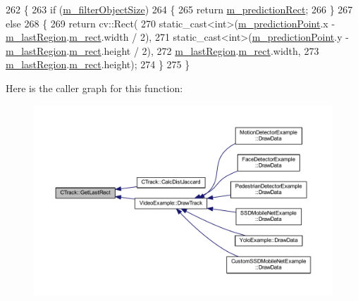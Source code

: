 \begin{DoxyCode}
262 \{
263     \textcolor{keywordflow}{if} (\mbox{\hyperlink{class_c_track_a5573dab5b9fe2e5143204355b8146c87}{m\_filterObjectSize}})
264     \{
265         \textcolor{keywordflow}{return} \mbox{\hyperlink{class_c_track_aeab9c3c95a6d988918f5874a8910b90b}{m\_predictionRect}};
266     \}
267     \textcolor{keywordflow}{else}
268     \{
269         \textcolor{keywordflow}{return} cv::Rect(
270                     static\_cast<int>(\mbox{\hyperlink{class_c_track_a8ee3f8baaf290aeb113f34c26a446a76}{m\_predictionPoint}}.x - 
      \mbox{\hyperlink{class_c_track_a5af91fbfad7ebf07bd0f681f915e440c}{m\_lastRegion}}.\mbox{\hyperlink{class_c_region_a6f68304e90428db829cc38792fa3e1e8}{m\_rect}}.width / 2),
271                     static\_cast<int>(\mbox{\hyperlink{class_c_track_a8ee3f8baaf290aeb113f34c26a446a76}{m\_predictionPoint}}.y - 
      \mbox{\hyperlink{class_c_track_a5af91fbfad7ebf07bd0f681f915e440c}{m\_lastRegion}}.\mbox{\hyperlink{class_c_region_a6f68304e90428db829cc38792fa3e1e8}{m\_rect}}.height / 2),
272                     \mbox{\hyperlink{class_c_track_a5af91fbfad7ebf07bd0f681f915e440c}{m\_lastRegion}}.\mbox{\hyperlink{class_c_region_a6f68304e90428db829cc38792fa3e1e8}{m\_rect}}.width,
273                     \mbox{\hyperlink{class_c_track_a5af91fbfad7ebf07bd0f681f915e440c}{m\_lastRegion}}.\mbox{\hyperlink{class_c_region_a6f68304e90428db829cc38792fa3e1e8}{m\_rect}}.height);
274     \}
275 \}
\end{DoxyCode}
Here is the caller graph for this function\+:\nopagebreak
\begin{figure}[H]
\begin{center}
\leavevmode
\includegraphics[width=350pt]{class_c_track_abe6c22779a5d7f0403980f4b4c647ade_icgraph}
\end{center}
\end{figure}
\mbox{\label{class_c_track_a925ad52d3067abad455e2419610a286f}} 
